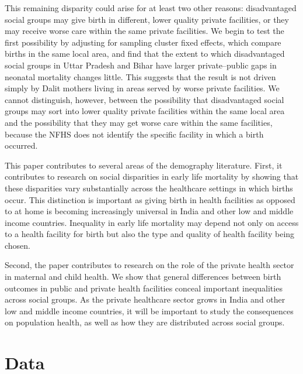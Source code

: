 \documentclass[12pt]{article}
\begin{document}
This remaining disparity could arise for at least two other reasons: disadvantaged social groups may give birth in different, lower quality private facilities, or they may receive worse care within the same private facilities. We begin to test the first possibility by adjusting for sampling cluster fixed effects, which compare births in the same local area, and find that the extent to which disadvantaged social groups in Uttar Pradesh and Bihar have larger private–public gaps in neonatal mortality changes little. This suggests that the result is not driven simply by Dalit mothers living in areas served by worse private facilities. We cannot distinguish, however, between the possibility that disadvantaged social groups may sort into lower quality private facilities within the same local area and the possibility that they may get worse care within the same facilities, because the NFHS does not identify the specific facility in which a birth occurred. 

This paper contributes to several areas of the demography literature. First, it contributes to research on social disparities in early life mortality by showing that these disparities vary substantially across the healthcare settings in which births occur. This distinction is important as giving birth in health facilities as opposed to at home is becoming increasingly universal in India and other low and middle income countries. Inequality in early life mortality may depend not only on access to a health facility for birth but also the type and quality of health facility being chosen. 

Second, the paper contributes to research on the role of the private health sector in maternal and child health. We show that general differences between birth outcomes in public and private health facilities conceal important inequalities across social groups. As the private healthcare sector grows in India and other low and middle income countries, it will be important to study the consequences on population health, as well as how they are distributed across social groups. 


\section{Data}
\end{document}
